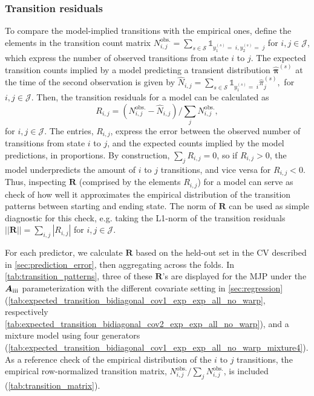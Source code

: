 \documentclass{article}
\newcommand{\RN}[1]{\textup{\uppercase\expandafter{\romannumeral#1}}}
\begin{document}
\subsubsection{Transition residuals} \label{sec:transition_patterns}

To compare the model-implied transitions with the empirical ones, define the elements in the transition count matrix
$
  N_{i,j}^{\text{obs.}} = \sum_{s \in \mathcal S} \mathds{1}_{y_1^{(s)} =\; i, y_2^{(s)} =\; j}
$ for $i,j \in \mathcal J$, which express the number of observed transitions from state $i$ to $j$. The expected transition counts implied by a model predicting a transient distribution $\widehat{\bm \pi}^{(s)}$ at the time of the second observation is given by
$
\widehat{  N}_{i,j} =  \sum_{s \in \mathcal S} \mathds{1}_{y_1^{(s)} = \; i} \widehat{ \pi}_j^{(s)},
$ for $i,j \in \mathcal J$.
Then, the transition residuals for a model can be calculated as
$$
  R_{i,j} = \left(  N_{i,j}^{\text{obs.}} - \widehat{  N}_{i,j} \right) / \sum_{j}   N_{i,j}^{\text{obs.}},
$$ for $i,j \in \mathcal J$.
The entries, $  R_{i,j}$, express the error between the observed number of transitions from state $i$ to $j$, and the expected counts implied by the model predictions, in proportions. 
By construction, $\sum_{j}   R_{i,j} = 0$, so if $  R_{i,j} > 0$, the model underpredicts the amount of $i$ to $j$ transitions, and vice versa for $  R_{i,j} < 0$.
Thus, inspecting $\bm R$ (comprised by the elements $R_{i,j}$) for a model can serve as check of how well it approximates the empirical distribution of the transition patterns between starting and ending state. The norm of $\bm R$ can be used as simple diagnostic for this check, e.g. taking the L1-norm of the transition residuals
$
|| \bm R || = \sum_{i,j} |  R_{i,j}|
$ for $i,j \in \mathcal J$.

For each predictor, we calculate $\bm R$ based on the held-out set in the CV described in \cref{sec:prediction_error}, then aggregating across the folds. In \cref{tab:transition_patterns}, three of these $\bm R$'s are displayed for the MJP under the $\bm{A}_{\RN{3}}$ parameterization with the different covariate setting in \cref{sec:regression} (\cref{tab:expected_transition_bidiagonal_cov1_exp_exp_all_no_warp}, respectively \cref{tab:expected_transition_bidiagonal_cov2_exp_exp_all_no_warp}), and a mixture model using four generators (\cref{tab:expected_transition_bidiagonal_cov1_exp_exp_all_no_warp_mixture4}). As a reference check of the empirical distribution of the $i$ to $j$ transitions, the empirical row-normalized transition matrix, $ N_{i,j}^{\text{obs.}} / \sum_{j}  N_{i,j}^{\text{obs.}}$, is included (\cref{tab:transition_matrix}).
\end{document}
